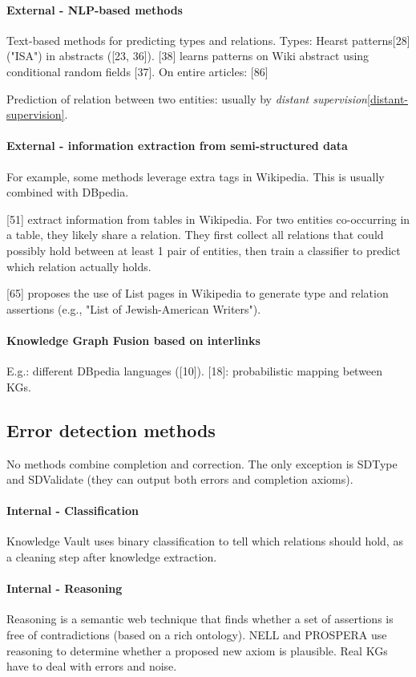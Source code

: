 \paragraph{External - NLP-based methods}
Text-based methods for predicting types and relations.
Types: Hearst patterns[28] ("ISA") in abstracts ([23, 36]).
[38] learns patterns on Wiki abstract using conditional random fields [37].
On entire articles: [86]

Prediction of relation between two entities: usually by \textit{distant
supervision}\ref{distant-supervision}.

\paragraph{External - information extraction from semi-structured data}
For example, some methods leverage extra tags in Wikipedia.
This is usually combined with DBpedia.

[51] extract information from tables in Wikipedia.
For two entities co-occurring in a table, they likely share a relation.
They first collect all relations that could possibly hold between at least 1
pair of entities, then train a classifier to predict which relation actually
holds.

[65] proposes the use of List pages in Wikipedia to generate type and relation
assertions (e.g., "List of Jewish-American Writers").

\paragraph{Knowledge Graph Fusion based on interlinks}
E.g.: different DBpedia languages ([10]). [18]: probabilistic mapping between
KGs.

\subsection{Error detection methods}
No methods combine completion and correction. The only exception is SDType and
SDValidate (they can output both errors and completion axioms).

\paragraph{Internal - Classification}
Knowledge Vault uses binary classification to tell which relations should hold,
as a cleaning step after knowledge extraction.

\paragraph{Internal - Reasoning}
Reasoning is a semantic web technique that finds whether a set of assertions is
free of contradictions (based on a rich ontology).
NELL and PROSPERA use reasoning to determine whether a proposed new axiom is
plausible. Real KGs have to deal with errors and noise.

